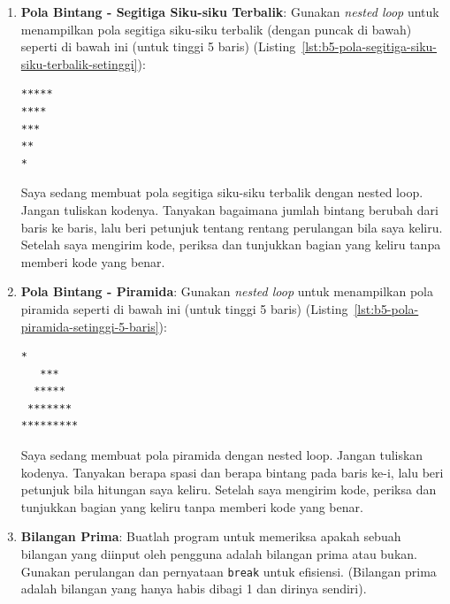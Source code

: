 \begin{enumerate}
      \begin{promptterarah}
      Saya sedang membuat pola segitiga siku-siku dengan nested loop. Jangan tuliskan kodenya. Tanyakan berapa bintang yang dicetak pada baris ke-i, lalu beri petunjuk bila jawaban saya keliru. Setelah saya mengirim kode, minta saya menjelaskan peran perulangan luar dan perulangan dalam.
      \end{promptterarah}
    \item \textbf{Pola Bintang - Segitiga Siku-siku Terbalik}: Gunakan \textit{nested loop} untuk menampilkan pola segitiga siku-siku terbalik (dengan puncak di bawah) seperti di bawah ini (untuk tinggi 5 baris) (Listing~\ref{lst:b5-pola-segitiga-siku-siku-terbalik-setinggi}):
\begin{lstlisting}[language=bash, caption={Pola segitiga siku-siku terbalik setinggi 5 baris}, label={lst:b5-pola-segitiga-siku-siku-terbalik-setinggi}]
*****
****
***
**
*
\end{lstlisting}

      \begin{promptterarah}
      Saya sedang membuat pola segitiga siku-siku terbalik dengan nested loop. Jangan tuliskan kodenya. Tanyakan bagaimana jumlah bintang berubah dari baris ke baris, lalu beri petunjuk tentang rentang perulangan bila saya keliru. Setelah saya mengirim kode, periksa dan tunjukkan bagian yang keliru tanpa memberi kode yang benar.
      \end{promptterarah}
    \item \textbf{Pola Bintang - Piramida}: Gunakan \textit{nested loop} untuk menampilkan pola piramida seperti di bawah ini (untuk tinggi 5 baris) (Listing~\ref{lst:b5-pola-piramida-setinggi-5-baris}):
\begin{lstlisting}[language=bash, caption={Pola piramida setinggi 5 baris}, label={lst:b5-pola-piramida-setinggi-5-baris}]
    *
   ***
  *****
 *******
*********
\end{lstlisting}
    
      \begin{promptterarah}
      Saya sedang membuat pola piramida dengan nested loop. Jangan tuliskan kodenya. Tanyakan berapa spasi dan berapa bintang pada baris ke-i, lalu beri petunjuk bila hitungan saya keliru. Setelah saya mengirim kode, periksa dan tunjukkan bagian yang keliru tanpa memberi kode yang benar.
      \end{promptterarah}
    \item \textbf{Bilangan Prima}: Buatlah program untuk memeriksa apakah sebuah bilangan yang diinput oleh pengguna adalah bilangan prima atau bukan. Gunakan perulangan dan pernyataan \texttt{break} untuk efisiensi. (Bilangan prima adalah bilangan yang hanya habis dibagi 1 dan dirinya sendiri).


\end{enumerate}
